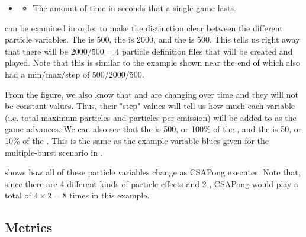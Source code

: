 \begin{singlespace}
\begin{itemize}[nolistsep,topsep=5pt]
		\item {}
		\begin{itemize}[nolistsep,topsep=0pt]
			\item The amount of time in seconds that a single game lasts.
		\end{itemize}

	\end{itemize}

\end{singlespace}

 can be examined in order to make the distinction clear between the different particle variables. The  is 500, the  is 2000, and the  is 500. This tells us right away that there will be $ 2000 / 500 = 4 $ particle definition files that will be created and played\footnotemark. Note that this is similar to the example shown near the end of  which also had a min/max/step of 500/2000/500.

From the figure, we also know that  and  are changing over time and they will not be constant values. Thus, their "step" values will tell us how much each variable (i.e. total maximum particles and particles per emission) will be added to as the game advances. We can also see that the  is 500, or 100\% of the , and the  is 50, or 10\% of the . This is the same as the example variable blues given for the multiple-burst scenario in .

 shows how all of these particle variables change as CSAPong executes. Note that, since there are 4 different kinds of particle effects and 2 , CSAPong would play a total of $ 4 \times 2 = 8 $ times in this example.


\subsection{Metrics}\label{ssec:instr_metrics_system_metrics}

